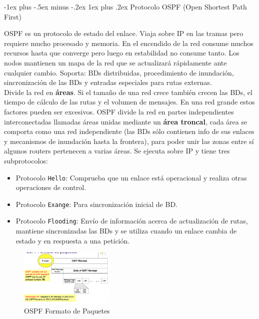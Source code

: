 \documentclass[10pt,portrait, twocolumn]{article}
\makeatletter
\renewcommand{\subsubsection}{\@startsection{subsubsection}{3}{0mm}%
                                {-1ex plus -.5ex minus -.2ex}%
                                {1ex plus .2ex}%
                                {\normalfont\small\bfseries}}
\makeatother
\begin{document}
\subsubsection{Protocolo OSPF (Open Shortest Path First)}

OSPF es un protocolo de estado del enlace. Viaja sobre IP en las tramas pero requiere mucho procesado y  memoria. En el encendido de la red consume muchos recursos hasta que converge pero luego en estabilidad no consume tanto. Los nodos mantienen un mapa de la red que se actualizará rápidamente ante cualquier cambio. Soporta: BDs distribuidas, procedimiento de inundación, sincronización de las BDs y entradas especiales para rutas externas.\\

Divide la red en \textbf{áreas}. Si el tamaño de una red crece también crecen las BDs, el tiempo de cálculo de las rutas y el volumen de mensajes. En una red grande estos factores pueden ser excesivos. OSPF divide la red en partes independientes interconectadas llamadas áreas unidas mediante un \textbf{área troncal}, cada área se comporta como una red independiente (las BDs sólo contienen info de sus enlaces y mecanismos de inundación hasta la frontera), para poder unir las zonas entre sí algunos routers pertenecen a varias áreas. Se ejecuta sobre IP y tiene tres subprotocolos:

	\begin{itemize}
		\item Protocolo \texttt{Hello}: Comprueba que un enlace está operacional y realiza otras operaciones de control.
		\item Protocolo \texttt{Exange}: Para sincronización inicial de BD.
		\item Protocolo \texttt{Flooding}: Envío de información acerca de actualización de rutas, mantiene sincronizadas las BDs y se utiliza cuando un enlace cambia de estado y en respuesta a una petición.
	\end{itemize}
	
	
\begin{figure}[h]
	\centering
     \includegraphics[width=0.4\textwidth]{OSPF}
      \caption{OSPF Formato de Paquetes}
      \label{fig:Regiones de frecuencias}
  \end{figure}
  
\end{document}
